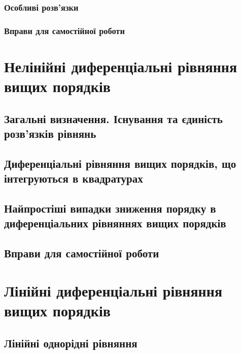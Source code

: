 		\subsubsection{Особливі розв'язки}
		

		\subsubsection{Вправи для самостійної роботи}
		

\section{Нелінійні диференціальні рівняння вищих порядків}


	\subsection{Загальні визначення. Існування та єдиність роз\-в'я\-з\-ків рівнянь}
	

	\subsection{Диференціальні рівняння вищих порядків, що інтегруються в квадратурах}
	

	\subsection{Найпростіші випадки зниження порядку в диференціальних рівняннях вищих порядків}
	

	\subsection{Вправи для самостійної роботи}
	

\section{Лі\-ній\-ні ди\-фе\-рен\-ці\-аль\-ні рів\-ня\-н\-ня ви\-щих \allowbreak по\-ряд\-ків}


	\subsection{Лінійні однорідні рівняння}
	

